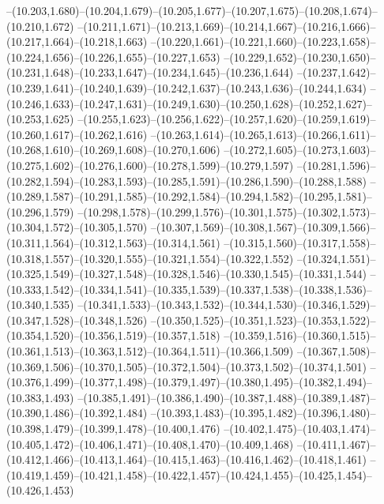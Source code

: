  --(10.203,1.680)--(10.204,1.679)--(10.205,1.677)--(10.207,1.675)--(10.208,1.674)--(10.210,1.672)%
  --(10.211,1.671)--(10.213,1.669)--(10.214,1.667)--(10.216,1.666)--(10.217,1.664)--(10.218,1.663)%
  --(10.220,1.661)--(10.221,1.660)--(10.223,1.658)--(10.224,1.656)--(10.226,1.655)--(10.227,1.653)%
  --(10.229,1.652)--(10.230,1.650)--(10.231,1.648)--(10.233,1.647)--(10.234,1.645)--(10.236,1.644)%
  --(10.237,1.642)--(10.239,1.641)--(10.240,1.639)--(10.242,1.637)--(10.243,1.636)--(10.244,1.634)%
  --(10.246,1.633)--(10.247,1.631)--(10.249,1.630)--(10.250,1.628)--(10.252,1.627)--(10.253,1.625)%
  --(10.255,1.623)--(10.256,1.622)--(10.257,1.620)--(10.259,1.619)--(10.260,1.617)--(10.262,1.616)%
  --(10.263,1.614)--(10.265,1.613)--(10.266,1.611)--(10.268,1.610)--(10.269,1.608)--(10.270,1.606)%
  --(10.272,1.605)--(10.273,1.603)--(10.275,1.602)--(10.276,1.600)--(10.278,1.599)--(10.279,1.597)%
  --(10.281,1.596)--(10.282,1.594)--(10.283,1.593)--(10.285,1.591)--(10.286,1.590)--(10.288,1.588)%
  --(10.289,1.587)--(10.291,1.585)--(10.292,1.584)--(10.294,1.582)--(10.295,1.581)--(10.296,1.579)%
  --(10.298,1.578)--(10.299,1.576)--(10.301,1.575)--(10.302,1.573)--(10.304,1.572)--(10.305,1.570)%
  --(10.307,1.569)--(10.308,1.567)--(10.309,1.566)--(10.311,1.564)--(10.312,1.563)--(10.314,1.561)%
  --(10.315,1.560)--(10.317,1.558)--(10.318,1.557)--(10.320,1.555)--(10.321,1.554)--(10.322,1.552)%
  --(10.324,1.551)--(10.325,1.549)--(10.327,1.548)--(10.328,1.546)--(10.330,1.545)--(10.331,1.544)%
  --(10.333,1.542)--(10.334,1.541)--(10.335,1.539)--(10.337,1.538)--(10.338,1.536)--(10.340,1.535)%
  --(10.341,1.533)--(10.343,1.532)--(10.344,1.530)--(10.346,1.529)--(10.347,1.528)--(10.348,1.526)%
  --(10.350,1.525)--(10.351,1.523)--(10.353,1.522)--(10.354,1.520)--(10.356,1.519)--(10.357,1.518)%
  --(10.359,1.516)--(10.360,1.515)--(10.361,1.513)--(10.363,1.512)--(10.364,1.511)--(10.366,1.509)%
  --(10.367,1.508)--(10.369,1.506)--(10.370,1.505)--(10.372,1.504)--(10.373,1.502)--(10.374,1.501)%
  --(10.376,1.499)--(10.377,1.498)--(10.379,1.497)--(10.380,1.495)--(10.382,1.494)--(10.383,1.493)%
  --(10.385,1.491)--(10.386,1.490)--(10.387,1.488)--(10.389,1.487)--(10.390,1.486)--(10.392,1.484)%
  --(10.393,1.483)--(10.395,1.482)--(10.396,1.480)--(10.398,1.479)--(10.399,1.478)--(10.400,1.476)%
  --(10.402,1.475)--(10.403,1.474)--(10.405,1.472)--(10.406,1.471)--(10.408,1.470)--(10.409,1.468)%
  --(10.411,1.467)--(10.412,1.466)--(10.413,1.464)--(10.415,1.463)--(10.416,1.462)--(10.418,1.461)%
  --(10.419,1.459)--(10.421,1.458)--(10.422,1.457)--(10.424,1.455)--(10.425,1.454)--(10.426,1.453)%
